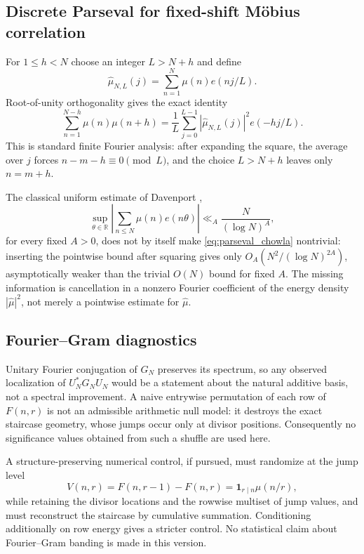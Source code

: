 \documentclass[11pt]{amsart}
\numberwithin{equation}{section}
\theoremstyle{plain}
\theoremstyle{definition}
\theoremstyle{remark}
\newcommand{\R}{\mathbb R}
\newcommand{\one}{\mathbf 1}
\newcommand{\mob}{\mu}
\newcommand{\Fsurf}{F}
\begin{document}
\subsection{Discrete Parseval for fixed-shift Möbius correlation}

For $1\le h<N$ choose an integer $L>N+h$ and define
\begin{equation}
\widehat\mob_{N,L}(j)=\sum_{n=1}^{N}\mob(n)e(nj/L).
\label{eq:finite_mu_DFT}
\end{equation}
Root-of-unity orthogonality gives the exact identity
\begin{equation}
\sum_{n=1}^{N-h}\mob(n)\mob(n+h)
=\frac1L\sum_{j=0}^{L-1}|\widehat\mob_{N,L}(j)|^2e(-hj/L).
\label{eq:parseval_chowla}
\end{equation}
This is standard finite Fourier analysis: after expanding the square, the average over $j$ forces $n-m-h\equiv0\pmod L$, and the choice $L>N+h$ leaves only $n=m+h$.

The classical uniform estimate of Davenport \cite{Davenport1937II},
\begin{equation}
\sup_{\theta\in\R}\left|\sum_{n\le N}\mob(n)e(n\theta)\right|
\ll_A \frac{N}{(\log N)^A},
\label{eq:Davenport_uniform}
\end{equation}
for every fixed $A>0$, does not by itself make \eqref{eq:parseval_chowla} nontrivial: inserting the pointwise bound after squaring gives only $O_A(N^2/(\log N)^{2A})$, asymptotically weaker than the trivial $O(N)$ bound for fixed $A$.  The missing information is cancellation in a nonzero Fourier coefficient of the energy density $|\widehat\mob|^2$, not merely a pointwise estimate for $\widehat\mob$.

\subsection{Fourier--Gram diagnostics}

Unitary Fourier conjugation of $G_N$ preserves its spectrum, so any observed localization of $U_N^*G_NU_N$ would be a statement about the natural additive basis, not a spectral improvement.  A naive entrywise permutation of each row of $F(n,r)$ is not an admissible arithmetic null model: it destroys the exact staircase geometry, whose jumps occur only at divisor positions.  Consequently no significance values obtained from such a shuffle are used here.

A structure-preserving numerical control, if pursued, must randomize at the jump level
\begin{equation}
V(n,r)=\Fsurf(n,r-1)-\Fsurf(n,r)=\one_{r\mid n}\mob(n/r),
\label{eq:jump_null_protocol}
\end{equation}
while retaining the divisor locations and the rowwise multiset of jump values, and must reconstruct the staircase by cumulative summation.  Conditioning additionally on row energy gives a stricter control.  No statistical claim about Fourier--Gram banding is made in this version.
\end{document}
